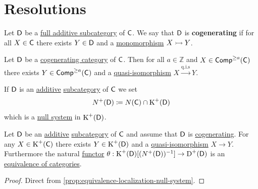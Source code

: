 \documentclass[../../main]{subfiles}
\begin{document}
\section{Resolutions}

\begin{definition}\label{def:cogenerating-category}
  Let \(\category{D}\) be a \hyperref[def:full-additive-subcategory]{full additive subcategory} of \(\category{C}\).
  We say that \(\category{D}\) is \textbf{cogenerating} if for all \(X \in \category{C}\) there exists \(Y \in \category{D}\) and a \hyperref[def:mono-epi-morphism]{monomorphism} \(X \monoarrow Y\).
\end{definition}

\begin{theorem}
  Let \(\category{D}\) be a \hyperref[def:cogenerating-category]{cogenerating category} of \(\category{C}\).
  Then for all \(a \in \mathbb{Z}\) and \(X \in \Complex[\geq a]{\category{C}}\) there exists \(Y \in \Complex[\geq a]{\category{C}}\) and a \hyperref[def:quasi-isomorphism]{quasi-isomorphism} \(X \xrightarrow{\text{q.i.s}} Y\).
\end{theorem}

\begin{notation}
  If \(\category{D}\) is an \hyperref[def:additive-category]{additive} \hyperref[def:subcategory]{subcategory} of \(\category{C}\) we set
  \begin{equation*}
    N^{+}(\category{D}) \coloneq N(\category{C}) \cap \operatorname{K}^{+}(\category{D})
  \end{equation*}
  which is a \hyperref[def:null-system]{null system} in \(\operatorname{K}^{+}(\category{D})\).
\end{notation}

\begin{corollary}\label{cor:localization-cogenerating}
  Let \(\category{D}\) be an \hyperref[def:additive-category]{additive} \hyperref[def:subcategory]{subcategory} of \(\category{C}\) and assume that \(\category{D}\) is \hyperref[def:cogenerating-category]{cogenerating}.
  For any \(X \in \operatorname{K}^{+}(\category{C})\) there exists \(Y \in \operatorname{K}^{+}(\category{D})\) and a \hyperref[def:quasi-isomorphism]{quasi-isomorphism} \(X \to Y\).
  Furthermore the natural \hyperref[def:functor]{functor} \(\theta: \operatorname{K}^{+}(\category{D})[(N^{+}(\category{D}))^{-1}] \to \operatorname{D}^{+}(\category{D})\) is an \hyperref[def:equivalent-categories]{equivalence of categories}.
\end{corollary}
\begin{proof}
  Direct from \autoref{prop:equivalence-localization-null-system}.
\end{proof}
\end{document}
